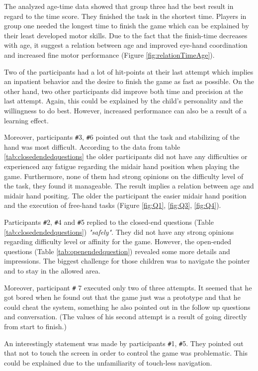 The analyzed age-time data showed that group three had the best result in regard to the time score. They finished the task in the shortest time. 
Players in group one needed the longest time to finish the game which can be explained by their least developed motor skills. Due to the fact that the finish-time decreases with age, it suggest a relation between age and improved eye-hand coordination and increased fine motor performance (Figure \ref{fig:relationTimeAge}).

Two of the participants had a lot of hit-points at their last attempt which implies an inpatient behavior and the desire to finish the game as fast as possible. On the other hand, two other participants did improve both time and precision at the last attempt. Again, this could be explained by the child's personality and the willingness to do best. However, increased performance can also be a result of a learning effect.

Moreover, participants \texttt{\#}3, \texttt{\#}6 pointed out that the task and stabilizing of the hand was most difficult. According to the data from table \ref{tab:closedendedquestions} the older participants did not have any difficulties or experienced any fatigue regarding the midair hand position when playing the game. Furthermore, none of them had strong opinions on the difficulty level of the task, they found it manageable. The result implies a relation between age and midair hand positing. The older the participant the easier midair hand position and the execution of free-hand tasks (Figure \ref{fig:Q1}, \ref{fig:Q3}, \ref{fig:Q4}). 


Participants \texttt{\#}2, \texttt{\#}4 and \texttt{\#}5 replied to the closed-end questions (Table \ref{tab:closedendedquestions}) \textit{"safely"}. They did not have any strong opinions regarding difficulty level or affinity for the game. However, the open-ended questions (Table \ref{tab:openendedquestion}) revealed some more details and impressions. The biggest challenge for those children was to navigate the pointer and to stay in the allowed area.  

Moreover, participant \texttt{\#} 7 executed only two of three attempts. It seemed that he got bored when he found out that the game just was a prototype and that he could cheat the system, something he also pointed out in the follow up questions and conversation. (The values of his second attempt is a result of going directly from start to finish.)


An interestingly statement was made by participants \texttt{\#}1, \texttt{\#}5. They pointed out that not to touch the screen in order to control the game was problematic. This could be explained due to the unfamiliarity of touch-less navigation.

